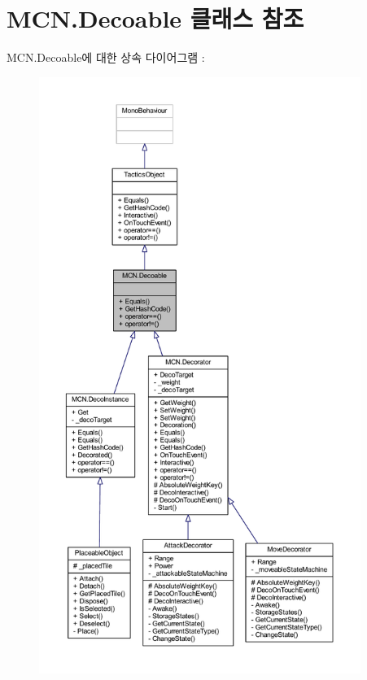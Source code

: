 \hypertarget{class_m_c_n_1_1_decoable}{}\section{M\+C\+N.\+Decoable 클래스 참조}
\label{class_m_c_n_1_1_decoable}


M\+C\+N.\+Decoable에 대한 상속 다이어그램 \+: 
\nopagebreak
\begin{figure}[H]
\begin{center}
\leavevmode
\includegraphics[height=550pt]{class_m_c_n_1_1_decoable__inherit__graph}
\end{center}
\end{figure}


